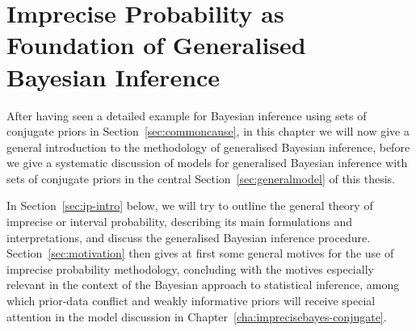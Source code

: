 \chapter{Imprecise Probability as Foundation of Generalised Bayesian Inference}
\label{cha:gbi}




After having seen a detailed example for Bayesian inference using sets of conjugate priors in Section~\ref{sec:commoncause},
in this chapter we will now give a general introduction to the methodology of generalised Bayesian inference,
before we give a systematic discussion of models for generalised Bayesian inference with sets of conjugate priors
in the central Section~\ref{sec:generalmodel} of this thesis.

\medskip

In Section~\ref{sec:ip-intro} below, we will try to outline the general theory of imprecise or interval probability,
describing its main formulations and interpretations, and discuss the generalised Bayesian inference procedure.
Section~\ref{sec:motivation} then gives at first some general motives for the use of imprecise probability methodology,
concluding with the motives especially relevant in the context of the Bayesian approach to statistical inference,
among which prior-data conflict and weakly informative priors will receive special attention
in the model discussion in Chapter~\ref{cha:imprecisebayes-conjugate}.

